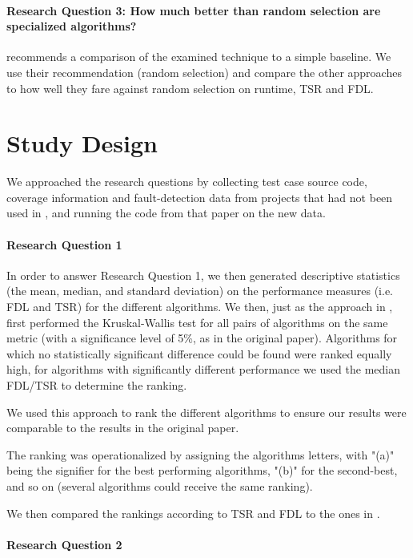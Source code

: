 \paragraph{Research Question 3: How much better than random selection are specialized algorithms?}

\cite{khan2018systematic} recommends a comparison of the examined
technique to a simple baseline. We use their recommendation (random
selection) and compare the other approaches to how well they fare against
random selection on runtime, TSR and FDL.

\section{Study Design}

We approached the research questions by collecting test case source code,
coverage information and fault-detection data from projects that had
not been used in \cite{cruciani2019scalable}, and running the code from
that paper on the new data.

\paragraph{Research Question 1}

In order to answer Research Question 1, we then generated descriptive
statistics (the mean, median, and standard deviation) on the performance
measures (i.e. FDL and TSR) for the different algorithms. We then,
just as the approach in \cite{cruciani2019scalable}, first performed the
Kruskal-Wallis test for all pairs of algorithms on the same metric (with
a significance level of 5\%, as in the original paper). Algorithms for
which no statistically significant difference could be found were ranked
equally high, for algorithms with significantly different performance
we used the median FDL/TSR to determine the ranking.

We used this approach to rank the different algorithms to ensure our
results were comparable to the results in the original paper.

The ranking was operationalized by assigning the algorithms letters,
with "(a)" being the signifier for the best performing algorithms,
"(b)" for the second-best, and so on (several algorithms could receive
the same ranking).

We then compared the rankings according to TSR and FDL to the ones in
\cite{cruciani2019scalable}.

\paragraph{Research Question 2}


